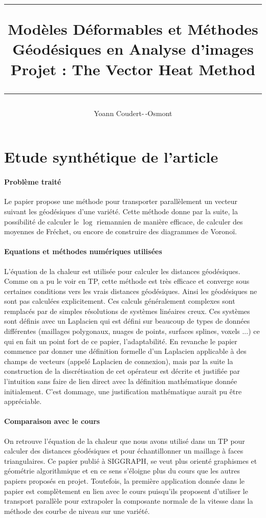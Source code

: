 \documentclass[11pt]{article}
\title{
	\noindent\rule{\linewidth}{0.4pt}
	{ \huge Modèles Déformables et Méthodes Géodésiques en Analyse d’images } \\
	Projet : The Vector Heat Method \cite{VHM}
	\noindent\rule{\linewidth}{1pt}
}
\author{Yoann Coudert-\,-Osmont}
\begin{document}
	
	\maketitle
	
	\section{Etude synthétique de l'article}
	
	\paragraph{Problème traité}
	Le papier propose une méthode pour transporter parallèlement un vecteur suivant les géodésiques d'une variété. Cette méthode donne par la suite, la possibilité de calculer le $\log$ riemannien de manière efficace, de calculer des moyennes de Fréchet, ou encore de construire des diagrammes de Voronoï.
	
	\paragraph{Equations et méthodes numériques utilisées}
	L'équation de la chaleur est utilisée pour calculer les distances géodésiques. Comme on a pu le voir en TP, cette méthode est très efficace et converge sous certaines conditions vers les vrais distances géodésiques. Ainsi les géodésiques ne sont pas calculées explicitement. Ces calculs généralement complexes sont remplacés par de simples résolutions de systèmes linéaires creux. Ces systèmes sont définis avec un Laplacien qui est défini sur beaucoup de types de données différentes (maillages polygonaux, nuages de points, surfaces splines, voxels ...) ce qui en fait un point fort de ce papier, l'adaptabilité. En revanche le papier commence par donner une définition formelle d'un Laplacien applicable à des champs de vecteurs (appelé Laplacien de connexion), mais par la suite la construction de la discrétisation de cet opérateur est décrite et justifiée par l'intuition sans faire de lien direct avec la définition mathématique donnée initialement. C'est dommage, une justification mathématique aurait pu être appréciable.
	
	\paragraph{Comparaison avec le cours}
	On retrouve l'équation de la chaleur que nous avons utilisé dans un TP pour calculer des distances géodésiques et pour échantillonner un maillage à faces triangulaires. Ce papier publié à SIGGRAPH, se veut plus orienté graphismes et géométrie algorithmique et en ce sens s'éloigne plus du cours que les autres papiers proposés en projet. Toutefois, la première application donnée dans le papier est complètement en lien avec le cours puisqu'ils proposent d'utiliser le transport parallèle pour extrapoler la composante normale de la vitesse dans la méthode des courbe de niveau sur une variété.
	
\end{document}

